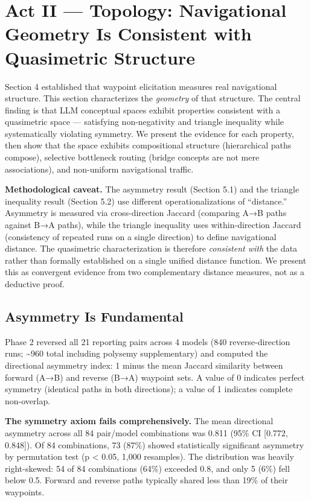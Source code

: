 \section{Act II --- Topology: Navigational Geometry Is Consistent with Quasimetric Structure}\label{act-ii-topology-navigational-geometry-is-consistent-with-quasimetric-structure}

Section 4 established that waypoint elicitation measures real navigational structure. This section characterizes the \emph{geometry} of that structure. The central finding is that LLM conceptual spaces exhibit properties consistent with a quasimetric space --- satisfying non-negativity and triangle inequality while systematically violating symmetry. We present the evidence for each property, then show that the space exhibits compositional structure (hierarchical paths compose), selective bottleneck routing (bridge concepts are not mere associations), and non-uniform navigational traffic.

\textbf{Methodological caveat.} The asymmetry result (Section 5.1) and the triangle inequality result (Section 5.2) use different operationalizations of ``distance.'' Asymmetry is measured via cross-direction Jaccard (comparing A→B paths against B→A paths), while the triangle inequality uses within-direction Jaccard (consistency of repeated runs on a single direction) to define navigational distance. The quasimetric characterization is therefore \emph{consistent with} the data rather than formally established on a single unified distance function. We present this as convergent evidence from two complementary distance measures, not as a deductive proof.

\subsection{Asymmetry Is Fundamental}\label{asymmetry-is-fundamental}

Phase 2 reversed all 21 reporting pairs across 4 models (840 reverse-direction runs; \textasciitilde960 total including polysemy supplementary) and computed the directional asymmetry index: 1 minus the mean Jaccard similarity between forward (A→B) and reverse (B→A) waypoint sets. A value of 0 indicates perfect symmetry (identical paths in both directions); a value of 1 indicates complete non-overlap.

\textbf{The symmetry axiom fails comprehensively.} The mean directional asymmetry across all 84 pair/model combinations was 0.811 (95\% CI {[}0.772, 0.848{]}). Of 84 combinations, 73 (87\%) showed statistically significant asymmetry by permutation test (p \textless{} 0.05, 1,000 resamples). The distribution was heavily right-skewed: 54 of 84 combinations (64\%) exceeded 0.8, and only 5 (6\%) fell below 0.5. Forward and reverse paths typically shared less than 19\% of their waypoints.

